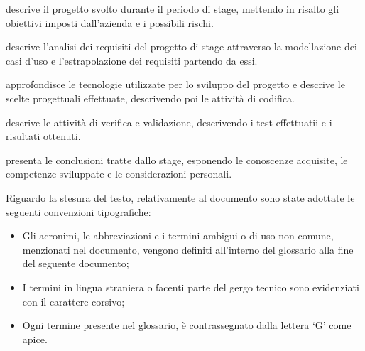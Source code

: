 \begin{description}
    
    \item[{\hyperref[cap:descrizione-stage]{Il secondo capitolo}}] descrive il progetto svolto durante il periodo di stage, mettendo in risalto gli obiettivi imposti dall'azienda e i possibili rischi.
    
    \item[{\hyperref[cap:analisi-requisiti]{Il terzo capitolo}}] descrive l'analisi dei requisiti del progetto di stage attraverso la modellazione dei casi d'uso e l'estrapolazione dei requisiti partendo da essi.
    \item     
    \item[{\hyperref[cap:progettazione-codifica]{Il quarto capitolo}}] approfondisce le tecnologie utilizzate per lo sviluppo del progetto e descrive le scelte progettuali effettuate, descrivendo poi le attività di codifica.
    
    \item[{\hyperref[cap:verifica-validazione]{Il quinto capitolo}}] descrive le attività di verifica e validazione, descrivendo i test effettuatii e i risultati ottenuti.
    
    \item[{\hyperref[cap:conclusioni]{Il sesto capitolo}}] presenta le conclusioni tratte dallo stage, esponendo le conoscenze acquisite, le competenze sviluppate e le considerazioni personali. 
\end{description}

\clearpage

Riguardo la stesura del testo, relativamente al documento sono state adottate le seguenti convenzioni tipografiche:
\begin{itemize}
  \item Gli acronimi, le abbreviazioni e i termini ambigui o di uso non comune, menzionati nel documento, vengono definiti all'interno del glossario alla fine del seguente documento;
  \item I termini in lingua straniera o facenti parte del gergo tecnico sono evidenziati con il carattere corsivo;
  \item Ogni termine presente nel glossario, è contrassegnato dalla lettera `G' come apice.
\end{itemize}
